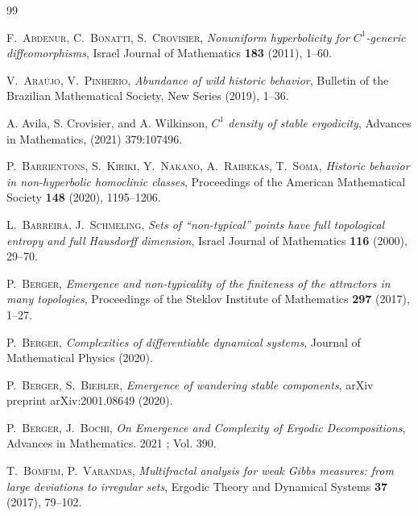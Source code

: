\documentclass{amsart}
\theoremstyle{plain}
\theoremstyle{definition}
\theoremstyle{remark}
\numberwithin{equation}{section}
\begin{document}
\begin{thebibliography}{99}

\textsc{F.~Abdenur, C.~Bonatti, S.~Crovisier},
\textit{Nonuniform hyperbolicity for $C^1$-generic diffeomorphisms},  
Israel Journal of Mathematics
\textbf{183} (2011), 
1--60.

%
%
%
%
%
%
% 
\textsc{V.~Ara\'ujo, V.~Pinherio}, 
\textit{Abundance of wild historic behavior}, 
Bulletin of the Brazilian Mathematical Society, New Series
 (2019), 
 1--36.


A. Avila, S. Crovisier, and A. Wilkinson, \emph{$C^1$ density of stable ergodicity}, Advances in Mathematics, (2021) 379:107496.

\textsc{P.~Barrientons, S.~Kiriki, Y.~Nakano, A.~Raibekas, T.~Soma}, 
\textit{Historic behavior in non-hyperbolic homoclinic classes}, 
Proceedings of the American Mathematical Society
\textbf{148} (2020),
1195--1206.


\textsc{L.~Barreira, J.~Schmeling}, 
\textit{Sets of ``non-typical'' points have full topological entropy and full Hausdorff dimension}, 
Israel Journal of Mathematics
\textbf{116} (2000), 
29--70.





\textsc{P.~Berger}, 
\textit{Emergence and non-typicality of the finiteness of the attractors in many topologies}, 
Proceedings of the Steklov Institute of Mathematics
\textbf{297} (2017), 
1--27.

%
% 
\textsc{P.~Berger}, 
\textit{Complexities of differentiable dynamical systems}, 
Journal of Mathematical Physics
 (2020).

\textsc{P.~Berger, S.~Biebler}, 
\textit{Emergence of wandering stable components}, 
arXiv preprint arXiv:2001.08649
 (2020).

\textsc{P.~Berger, J.~Bochi}, 
\textit{On Emergence and Complexity of Ergodic Decompositions}, 
Advances in Mathematics. 2021 ; Vol. 390.
% 
% 

\textsc{T.~Bomfim, P.~Varandas},
\textit{Multifractal analysis for weak Gibbs measures: from large deviations to irregular sets},
Ergodic Theory and Dynamical Systems
\textbf{37} (2017), 
79--102.


\end{thebibliography}
\end{document}
